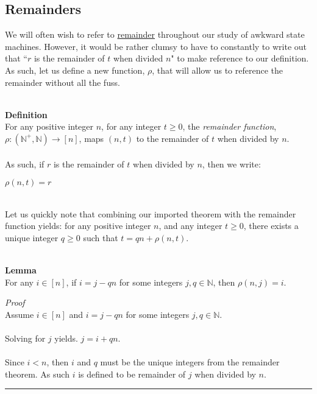 \documentclass[a4paper,12pt]{article}
\begin{document}
\subsection{Remainders}
We will often wish to refer to \hyperlink{theorem:remainder}{remainder} throughout our study of awkward state machines. However, it would be rather clumsy to have to constantly to write out that ``$r$ is the remainder of $t$ when divided $n$" to make reference to our definition. As such, let us define a new function, $\rho$, that will allow us to reference the remainder without all the fuss.\\
\\
\begin{tcolorbox}
\textbf{Definition}\\
For any positive integer $n$, for any integer $t \geq 0$, the \textit{remainder function}, $\rho: (\mathbb{N^{+}}, \mathbb{N}) \rightarrow [n]$, maps $(n, t)$ to the remainder of $t$ when divided by $n$.\\
\\
As such, if $r$ is the remainder of $t$ when divided by $n$, then we write:
\begin{center}
$\rho(n, t) = r$
\end{center}
\end{tcolorbox}
\noindent
\\
Let us quickly note that combining our imported theorem with the remainder function yields: for any positive integer $n$, and any integer $t \geq 0$, there exists a unique integer $q \geq 0$ such that $t = qn + \rho(n, t)$.\\
\\
\begin{tcolorbox}
\textbf{Lemma}\\
For any $i \in [n]$, if $i = j - qn$ for some integers $j, q \in \mathbb{N}$, then $\rho(n, j) = i$.
\end{tcolorbox}
\noindent
\textit{Proof}\\
Assume $i \in [n]$ and $i = j - qn$ for some integers $j, q \in \mathbb{N}$.\\
\\
Solving for $j$ yields. $j = i + qn$.\\
\\
Since $i < n$, then $i$ and $q$ must be the unique integers from the remainder theorem. As such $i$ is defined to be remainder of $j$ when divided by $n$. 
\begin{center}
\noindent\rule{8cm}{0.4pt}
\end{center}
\end{document}
